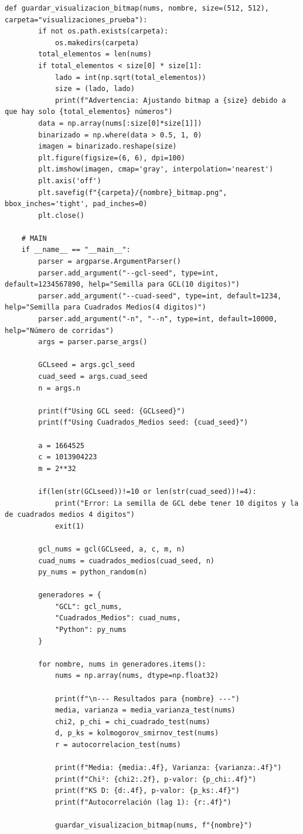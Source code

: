 \documentclass{article}
\begin{document}
\begin{Verbatim}[fontsize=\scriptsize]
    def guardar_visualizacion_bitmap(nums, nombre, size=(512, 512), carpeta="visualizaciones_prueba"):
        if not os.path.exists(carpeta):
            os.makedirs(carpeta)
        total_elementos = len(nums)
        if total_elementos < size[0] * size[1]:
            lado = int(np.sqrt(total_elementos))
            size = (lado, lado)
            print(f"Advertencia: Ajustando bitmap a {size} debido a que hay solo {total_elementos} números")
        data = np.array(nums[:size[0]*size[1]])
        binarizado = np.where(data > 0.5, 1, 0)
        imagen = binarizado.reshape(size)
        plt.figure(figsize=(6, 6), dpi=100)
        plt.imshow(imagen, cmap='gray', interpolation='nearest')
        plt.axis('off')
        plt.savefig(f"{carpeta}/{nombre}_bitmap.png", bbox_inches='tight', pad_inches=0)
        plt.close()
    
    # MAIN
    if __name__ == "__main__":
        parser = argparse.ArgumentParser()
        parser.add_argument("--gcl-seed", type=int, default=1234567890, help="Semilla para GCL(10 digitos)")
        parser.add_argument("--cuad-seed", type=int, default=1234, help="Semilla para Cuadrados Medios(4 digitos)")
        parser.add_argument("-n", "--n", type=int, default=10000, help="Número de corridas")
        args = parser.parse_args()
    
        GCLseed = args.gcl_seed
        cuad_seed = args.cuad_seed
        n = args.n
    
        print(f"Using GCL seed: {GCLseed}")
        print(f"Using Cuadrados_Medios seed: {cuad_seed}")
    
        a = 1664525
        c = 1013904223
        m = 2**32
    
        if(len(str(GCLseed))!=10 or len(str(cuad_seed))!=4):
            print("Error: La semilla de GCL debe tener 10 digitos y la de cuadrados medios 4 digitos")
            exit(1)
    
        gcl_nums = gcl(GCLseed, a, c, m, n)
        cuad_nums = cuadrados_medios(cuad_seed, n)
        py_nums = python_random(n)
    
        generadores = {
            "GCL": gcl_nums,
            "Cuadrados_Medios": cuad_nums,
            "Python": py_nums
        }
    
        for nombre, nums in generadores.items():
            nums = np.array(nums, dtype=np.float32)
    
            print(f"\n--- Resultados para {nombre} ---")
            media, varianza = media_varianza_test(nums)
            chi2, p_chi = chi_cuadrado_test(nums)
            d, p_ks = kolmogorov_smirnov_test(nums)
            r = autocorrelacion_test(nums)
    
            print(f"Media: {media:.4f}, Varianza: {varianza:.4f}")
            print(f"Chi²: {chi2:.2f}, p-valor: {p_chi:.4f}")
            print(f"KS D: {d:.4f}, p-valor: {p_ks:.4f}")
            print(f"Autocorrelación (lag 1): {r:.4f}")
    
            guardar_visualizacion_bitmap(nums, f"{nombre}")
    \end{Verbatim}
    
\end{document}
